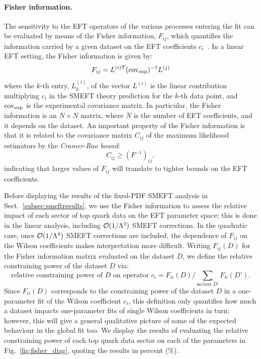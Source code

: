 \documentclass[withindex,glossary]{cam-thesis}
\begin{document}
\paragraph{Fisher information.}
The sensitivity to the EFT operators of the various processes entering
the fit can be evaluated by means of the Fisher information, $F_{ij}$, which
quantifies the information carried by a given dataset on the EFT coefficients $c_i$~\cite{Brehmer:2016nyr}. 
In a linear EFT setting,
the Fisher information is given by:
\begin{equation}
\label{eq:fisherdef}
F_{ij} = L^{(i)T} ({\rm cov}_{\rm exp})^{-1} L^{(j)}
\end{equation}
where the $k$-th entry, $L^{(i)}_k$, of the vector $L^{(i)}$ is the
linear contribution multiplying $c_i$ in the SMEFT theory prediction
for the $k$-th data point, and ${\rm cov}_{\rm exp}$ is the
experimental covariance matrix. In particular, the Fisher information
is an $N \times N$ matrix, where $N$ is the number of EFT
coefficients, and it depends on the dataset. 
An important property of the Fisher information is that it is related to the covariance matrix $C_{ij}$ of the maximum likelihood estimators by the \textit{Cramer-Rao bound}:
\begin{equation}
\label{eq:cramerrao}
C_{ij} \geq (F^{-1})_{ij},
\end{equation}
indicating that larger values of $F_{ij}$ will translate to tighter bounds on the
EFT coefficients.

Before displaying the results of the fixed-PDF SMEFT analysis in
Sect.~\ref{subsec:smeftresults}, we use the Fisher information 
to assess the relative impact of each sector of top quark data on the
EFT parameter space; this is done in the linear analysis, including
${\cal O}(1/\Lambda^2)$ SMEFT corrections.  
In the quadratic case, once ${\cal O}(1/\Lambda^4)$ SMEFT corrections
are included, the dependence of $F_{ij}$ on the Wilson coefficients makes interpretation more difficult.
Writing $F_{ij}(D)$ for the
Fisher information matrix evaluated on the dataset $D$, we define the relative constraining power of the dataset $D$
via:
\begin{equation}
\label{eq:relativeconstrainingpower}
	\textrm{relative constraining power of }D\textrm{ on operator }c_i = F_{ii}(D) \bigg/ \displaystyle \sum_{\text{sectors }D'} F_{ii}(D').
\end{equation}
%
Since $F_{ii}(D)$ corresponds to the constraining power of the dataset $D$ in a one-parameter fit of the Wilson coefficient $c_i$,
this definition only quantifies how much a dataset impacts one-parameter fits of single Wilson coefficients in turn; however, this will give 
a general qualitative picture of some of the expected behaviour in the global fit too. 
We display the results of evaluating the relative constraining power of each top quark data sector on each of the
parameters in Fig.~\ref{fig:fisher_diag}, quoting the results in percent (\%).
\end{document}
